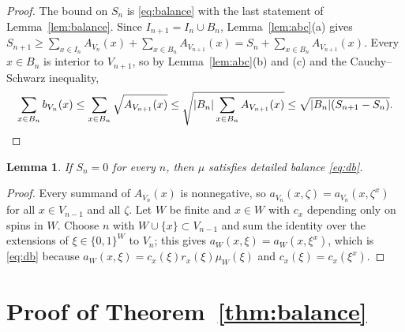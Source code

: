 \documentclass[11pt]{amsart}
\newtheorem{lemma}[theorem]{Lemma}
\theoremstyle{remark}
\begin{document}
\begin{proof}
The bound on $S_n$ is \eqref{eq:balance} with the last statement of Lemma~\ref{lem:balance}. Since
$I_{n+1}=I_n\cup B_n$, Lemma~\ref{lem:abc}(a) gives
$S_{n+1}\ge\sum_{x\in I_n}A_{V_n}(x)+\sum_{x\in B_n}A_{V_{n+1}}(x)=S_n+\sum_{x\in B_n}A_{V_{n+1}}(x)$. Every $x\in B_n$
is interior to $V_{n+1}$, so by Lemma~\ref{lem:abc}(b) and (c) and the Cauchy--Schwarz inequality,
\[
\sum_{x\in B_n}b_{V_n}(x)\le\sum_{x\in B_n}\sqrt{A_{V_{n+1}}(x)}\le\sqrt{|B_n|\sum_{x\in B_n}A_{V_{n+1}}(x)}
\le\sqrt{|B_n|(S_{n+1}-S_n)} .\qedhere
\]
\end{proof}

\begin{lemma}\label{lem:zeroS}
If $S_n=0$ for every $n$, then $\mu$ satisfies detailed balance \eqref{eq:db}.
\end{lemma}

\begin{proof}
Every summand of $A_{V_n}(x)$ is nonnegative, so $a_{V_n}(x,\zeta)=a_{V_n}(x,\zeta^x)$ for all $x\in V_{n-1}$ and all
$\zeta$. Let $W$ be finite and $x\in W$ with $c_x$ depending only on spins in $W$. Choose $n$ with $W\cup\{x\}\subset
V_{n-1}$ and sum the identity over the extensions of $\xi\in\{0,1\}^W$ to $V_n$; this gives
$a_W(x,\xi)=a_W(x,\xi^x)$, which is \eqref{eq:db} because $a_W(x,\xi)=c_x(\xi)r_x(\xi)\mu_W(\xi)$ and
$c_x(\xi)=c_x(\xi^x)$.
\end{proof}

\section{Proof of Theorem~\ref{thm:balance}}\label{sec:proofs}
\end{document}
